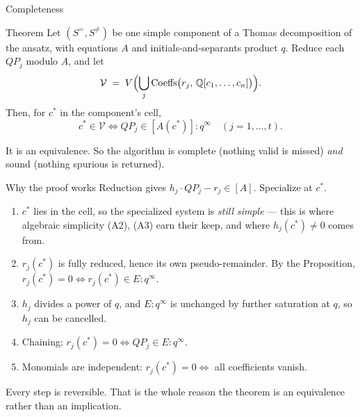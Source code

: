 \documentclass[10pt,aspectratio=169]{beamer}
\newcommand{\Q}{\mathbb{Q}}
\newcommand{\cstar}{c^{*}}
\begin{document}
\begin{frame}{Completeness}
\begin{block}{Theorem}
Let $(S^{=},S^{\neq})$ be one simple component of a Thomas decomposition of the
ansatz, with equations $A$ and initials-and-separants product $q$. Reduce each
$Q P_{j}$ modulo $A$, and let
\[
  \mathcal{V} \;=\; V\Bigl( \bigcup_{j} \operatorname{Coeffs}
     \bigl(r_{j},\, \Q[c_{1},\dots,c_{n}]\bigr) \Bigr) .
\]
Then, for $\cstar$ in the component's cell,
\[
  \cstar \in \mathcal{V}
  \iff
  Q P_{j} \in [A(\cstar)] : q^{\infty} \quad (j = 1,\dots,t).
\]
\end{block}

\pause
\medskip
It is an \alert{equivalence}. So the algorithm is complete (nothing valid is
missed) \emph{and} sound (nothing spurious is returned).
\end{frame}

\begin{frame}{Why the proof works}
Reduction gives $h_{j}\cdot Q P_{j} - r_{j} \in [A]$. Specialize at $\cstar$.

\pause
\medskip
\begin{enumerate}
  \item $\cstar$ lies in the cell, so the specialized system is \emph{still
        simple} --- this is where algebraic simplicity (A2), (A3) earn their
        keep, and where $h_{j}(\cstar) \neq 0$ comes from.
  \item $r_{j}(\cstar)$ is fully reduced, hence its own pseudo-remainder. By the
        Proposition, $r_{j}(\cstar) = 0 \iff r_{j}(\cstar) \in E:q^{\infty}$.
  \item $h_{j}$ divides a power of $q$, and $E:q^{\infty}$ is unchanged by further
        saturation at $q$, so $h_{j}$ can be cancelled.
  \item Chaining: $r_{j}(\cstar) = 0 \iff Q P_{j} \in E : q^{\infty}$.
  \item Monomials are independent: $r_{j}(\cstar)=0 \iff$ all coefficients vanish.
\end{enumerate}

\pause
\medskip
Every step is reversible. That is the whole reason the theorem is an equivalence
rather than an implication.
\end{frame}
\end{document}
